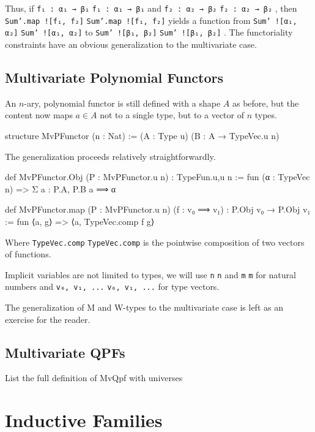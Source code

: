 \documentclass[titlepage]{report}
\newenvironment{remark}{%
\begin{framed}
\begin{trivlist}
    \item[\hskip \labelsep {\bfseries Remark:}]}%
{%
\end{trivlist}%
\end{framed}
}
\newenvironment{todo}{%
\definecolor{shadecolor}{HTML}{F8E0E0}%
\begin{shaded}%
\begin{trivlist}                         
    \item[\hskip \labelsep {\bfseries Todo:}]}{\end{trivlist}\end{shaded}}
\newcommand\lean[1]{%
\ifx\leanmode\undefined%
\def\leanmode{1}%
\texttt{\small #1}%
\undef\leanmode%
\else%
\texttt{#1}%
\fi%
}
\begin{document}
Thus, if \lean{f₁ : α₁ → β₁} and \lean{f₂ : α₂ → β₂}, then \lean{Sum'.map ![f₁, f₂]} yields a function from \lean{Sum' ![α₁, α₂]} to \lean{Sum' ![β₁, β₂]}.
The functoriality constraints have an obvious generalization to the multivariate case.

\subsection{Multivariate Polynomial Functors}
An $n$-ary, polynomial functor is still defined with a shape $A$ as before, but the content now maps $a ∈ A$ not to a single type, but to a vector of $n$ types.

\begin{leancode}
    structure MvPFunctor (n : Nat) := (A : Type u) (B : A → TypeVec.{u} n)
\end{leancode}

The generalization proceeds relatively straightforwardly.
\begin{leancode}
    def MvPFunctor.Obj (P : MvPFunctor.{u} n) : TypeFun.{u,u} n
        := fun (α : TypeVec n) => Σ a : P.A, P.B a ⟹ α

    def MvPFunctor.map  (P : MvPFunctor.{u} n) 
                        (f : v₀ ⟹ v₁) 
                            : P.Obj v₀ → P.Obj v₁ 
        := fun ⟨a, g⟩ => ⟨a, TypeVec.comp f g⟩
\end{leancode}

Where \lean{TypeVec.comp} is the pointwise composition of two vectors of functions.

\begin{remark}
    Implicit variables are not limited to types, we will use \lean{n} and \lean{m} for natural numbers and \lean{v₀, v₁, ...} for type vectors.
\end{remark}

The generalization of M and W-types to the multivariate case is left as an exercise for the reader.

\subsection{Multivariate QPFs}

\begin{todo}
    List the full definition of MvQpf with universes
\end{todo}


\section{Inductive Families}
\label{sec:ind_families}
\end{document}
